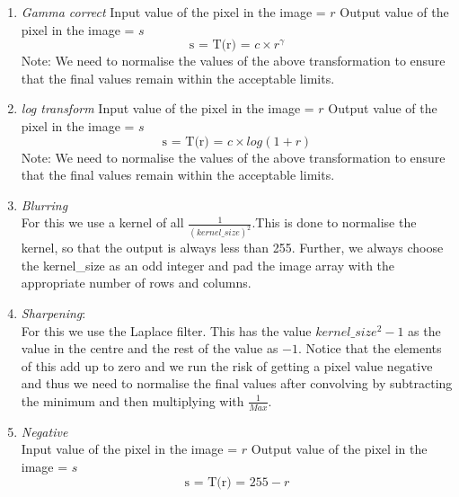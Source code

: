 \documentclass[conference]{IEEEtran}
\begin{document}
{{%
\begin{enumerate}

\item \textit{Gamma correct}
\newline Input value of the pixel in the image = $r$
\newline Output value of the pixel in the image = $s$
\begin{equation}
\text{s = T(r) = } c\times r^\gamma\label{eq1}
\end{equation}
Note: We need to normalise the values of the above transformation to ensure that the final values remain within the acceptable limits.\\
\item \textit{log transform}
\newline Input value of the pixel in the image = $r$
\newline Output value of the pixel in the image = $s$
\begin{equation}
\text{s = T(r) = } c\times log(1 + r)\label{eq2}
\end{equation}
Note: We need to normalise the values of the above transformation to ensure that the final values remain within the acceptable limits.
\item \textit{Blurring}\\
For this we use a kernel of all $\frac{1}{(kernel\_size)^2}$.This is done to normalise the kernel, so that the output is always less than 255. Further, we always choose the kernel\_size as an odd integer and pad the image array with the appropriate number of rows and columns.

\item \textit{Sharpening}:\\
For this we use the Laplace filter. This has the value $kernel\_size^2-1$ as the value in the centre and the rest of the value as $-1$. Notice that the elements of this add up to zero and we run the risk of getting a pixel value negative and thus we need to normalise the final values after convolving by subtracting the minimum and then multiplying with $\frac{1}{Max}$.

\item \textit{Negative}\\
\newline Input value of the pixel in the image = $r$
\newline Output value of the pixel in the image = $s$
\begin{equation}
\text{s = T(r) = } 255 - r\label{eq3}
\end{equation}
\end{enumerate}
}}
\end{document}
